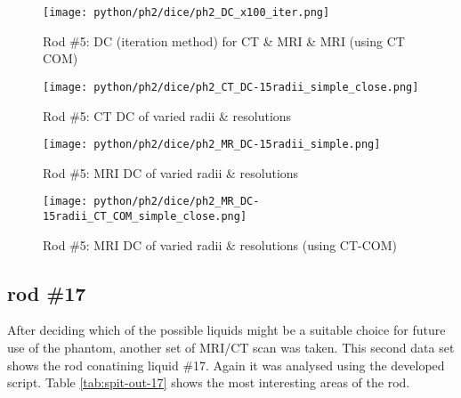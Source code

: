 \begin{figure}[!bp]
    \centering
    \texttt{[image: python/ph2/dice/ph2\_DC\_x100\_iter.png]}
    \caption{Rod \#5: DC (iteration method) for CT \& MRI \& MRI (using CT COM)}
    \label{fig:ph2_DC_x100}
\end{figure}

\begin{figure}[!bp]
  \centering
  \texttt{[image: python/ph2/dice/ph2\_CT\_DC-15radii\_simple\_close.png]}
  \caption{Rod \#5: CT DC of varied radii \& resolutions}
  \label{fig:ph2_CT_DC}
\end{figure}

\begin{figure}[!tbp]
  \centering
    \texttt{[image: python/ph2/dice/ph2\_MR\_DC-15radii\_simple.png]}
    \caption{Rod \#5: MRI DC of varied radii \& resolutions}
    \label{fig:ph2_MR_dc-opti}
\end{figure}

\begin{figure}[!tbp]
      \centering
    \texttt{[image: python/ph2/dice/ph2\_MR\_DC-15radii\_CT\_COM\_simple\_close.png]}
    \caption{Rod \#5: MRI DC of varied radii \& resolutions (using CT-COM)}
    \label{fig:ph2_MR_CT-COM_dc-opti}
\end{figure}

\clearpage



\subsection{rod \#17}

After deciding which of the possible liquids might be a suitable choice for future use of the phantom, another set of MRI/CT scan was taken.
This second data set shows the rod conatining liquid \#17.
Again it was analysed using the developed script.
Table \ref{tab:spit-out-17} shows the most interesting areas of the rod.

